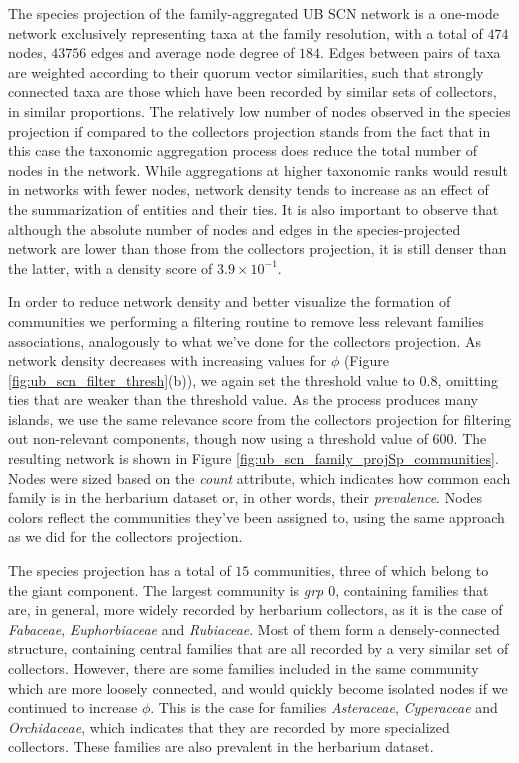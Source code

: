 The species projection of the family-aggregated UB SCN network is a one-mode network exclusively representing taxa at the family resolution, with a total of $474$ nodes, $43756$ edges and average node degree of $184$.
Edges between pairs of taxa are weighted according to their quorum vector similarities, such that strongly connected taxa are those which have been recorded by similar sets of collectors, in similar proportions.
%
The relatively low number of nodes observed in the species projection if compared to the collectors projection stands from the fact that in this case the taxonomic aggregation process does reduce the total number of nodes in the network.
While aggregations at higher taxonomic ranks would result in networks with fewer nodes, network density tends to increase as an effect of the summarization of entities and their ties.
%
It is also important to observe that although the absolute number of nodes and edges in the species-projected network are lower than those from the collectors projection, it is still denser than the latter, with a density score of $3.9 \times 10^{-1}$.

In order to reduce network density and better visualize the formation of communities we performing a filtering routine to remove less relevant families associations, analogously to what we've done for the collectors projection.
As network density decreases with increasing values for $\phi$ (Figure \ref{fig:ub_scn_filter_thresh}(b)), we again set the threshold value to $0.8$, omitting ties that are weaker than the threshold value. 
As the process produces many islands, we use the same relevance score from the collectors projection for filtering out non-relevant components, though now using a threshold value of $600$.
The resulting network is shown in Figure \ref{fig:ub_scn_family_projSp_communities}.
Nodes were sized based on the \textit{count} attribute, which indicates how common each family is in the herbarium dataset or, in other words, their \textit{prevalence}. 
Nodes colors reflect the communities they've been assigned to, using the same approach as we did for the collectors projection.

The species projection has a total of $15$ communities, three of which belong to the giant component. 
%
The largest community is \textit{grp $0$}, containing families that are, in general, more widely recorded by herbarium collectors, as it is the case of \textit{Fabaceae}, \textit{Euphorbiaceae} and \textit{Rubiaceae}.
Most of them form a densely-connected structure, containing central families that are all recorded by a very similar set of collectors.
However, there are some families included in the same community which are more loosely connected, and would quickly become isolated nodes if we continued to increase $\phi$. 
This is the case for families \textit{Asteraceae}, \textit{Cyperaceae} and \textit{Orchidaceae}, which indicates that they are recorded by more specialized collectors.
These families are also prevalent in the herbarium dataset.

